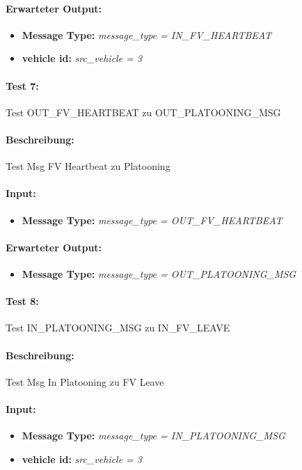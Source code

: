 \documentclass[a4paper, 12pt, titlepage]{scrartcl}
\begin{document}
{			\paragraph{Erwarteter Output:}
			\begin{itemize} \itemsep-0.5em
				\item \textbf{Message Type:} \emph{message\_type = IN\_FV\_HEARTBEAT}
				\item \textbf{vehicle id:} \emph{src\_vehicle = 3}
			\end{itemize}
			
			\paragraph{Test 7:}{Test OUT\_FV\_HEARTBEAT zu OUT\_PLATOONING\_MSG}
			\paragraph{Beschreibung:} Test Msg FV Heartbeat zu Platooning
			\paragraph{Input:}
			\begin{itemize} \itemsep-0.5em
				\item \textbf{Message Type:} \emph{message\_type = OUT\_FV\_HEARTBEAT}
			\end{itemize}
			\paragraph{Erwarteter Output:}
			\begin{itemize} \itemsep-0.5em
				\item \textbf{Message Type:} \emph{message\_type = OUT\_PLATOONING\_MSG}
			\end{itemize}				
					
			\paragraph{Test 8:}{Test IN\_PLATOONING\_MSG zu IN\_FV\_LEAVE}
			\paragraph{Beschreibung:} Test Msg In Platooning zu FV Leave
			\paragraph{Input:}
			\begin{itemize} \itemsep-0.5em
				\item \textbf{Message Type:} \emph{message\_type = IN\_PLATOONING\_MSG}
				\item \textbf{vehicle id:} \emph{src\_vehicle = 3}
			\end{itemize}
}
\end{document}
